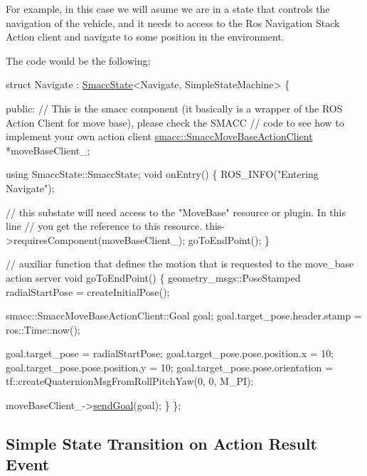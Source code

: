For example, in this case we will asume we are in a state that controls the navigation of the vehicle, and it needs to access to the Ros Navigation Stack Action client and navigate to some position in the environment.

 

The code would be the following\+:


\begin{DoxyCode}
\textcolor{keyword}{struct }Navigate : \hyperlink{classSmaccState}{SmaccState}<Navigate, SimpleStateMachine> 
\{

\textcolor{keyword}{public}:
  \textcolor{comment}{// This is the smacc component (it basically is a wrapper of the ROS Action Client for move base), please
       check the SMACC}
  \textcolor{comment}{// code to see how to implement your own action client}
  \hyperlink{classsmacc_1_1SmaccMoveBaseActionClient}{smacc::SmaccMoveBaseActionClient} *moveBaseClient\_;

  \textcolor{keyword}{using} SmaccState::SmaccState;
  \textcolor{keywordtype}{void} onEntry()
  \{
    ROS\_INFO(\textcolor{stringliteral}{"Entering Navigate"});

    \textcolor{comment}{// this substate will need access to the "MoveBase" resource or plugin. In this line}
    \textcolor{comment}{// you get the reference to this resource.}
    this->requiresComponent(moveBaseClient\_);
    goToEndPoint();
  \}

  \textcolor{comment}{// auxiliar function that defines the motion that is requested to the move\_base action server}
  \textcolor{keywordtype}{void} goToEndPoint() \{
    geometry\_msgs::PoseStamped radialStartPose = createInitialPose();

    smacc::SmaccMoveBaseActionClient::Goal goal;
    goal.target\_pose.header.stamp = ros::Time::now();

    goal.target\_pose = radialStartPose;
    goal.target\_pose.pose.position.x = 10;
    goal.target\_pose.pose.position.y = 10;
    goal.target\_pose.pose.orientation =
        tf::createQuaternionMsgFromRollPitchYaw(0, 0, M\_PI);

    moveBaseClient\_->\hyperlink{classsmacc_1_1SmaccActionClientBase_a58c67a87c5fb8ea1633573c58fe3eee1}{sendGoal}(goal);
  \}
\};
\end{DoxyCode}


\subsection*{Simple State Transition on Action Result Event}

